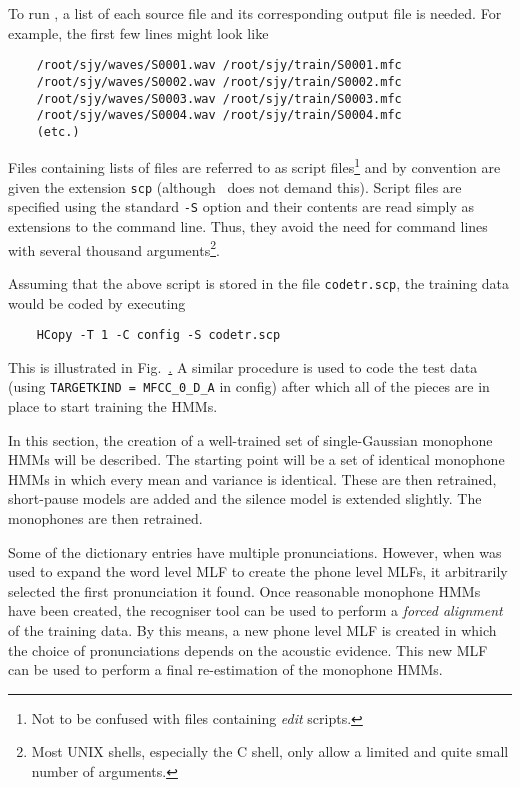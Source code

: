 To run ,  a list of
each source file and its corresponding output file is needed.  For example,
the first few lines might look like
\begin{verbatim}
    /root/sjy/waves/S0001.wav /root/sjy/train/S0001.mfc
    /root/sjy/waves/S0002.wav /root/sjy/train/S0002.mfc
    /root/sjy/waves/S0003.wav /root/sjy/train/S0003.mfc
    /root/sjy/waves/S0004.wav /root/sjy/train/S0004.mfc
    (etc.)
\end{verbatim}
Files containing lists of files are referred to as script files\footnote{
Not to be confused with files containing \textit{edit} scripts.
}
and
by convention are given the extension \texttt{scp} (although 
\HTK\ does not demand this).  Script files are specified using the standard
\texttt{-S} option and their contents are read simply as extensions
to the command line.  Thus, they avoid the need for command lines with
several thousand arguments\footnote{
Most UNIX shells, especially the C shell, only allow a limited and
quite small number of arguments.}.


\noindent
Assuming that the above script is stored in the file \texttt{codetr.scp},
the training data would be coded by executing
\begin{verbatim}
    HCopy -T 1 -C config -S codetr.scp
\end{verbatim}
This is illustrated in Fig.~\href{f:step5}. A similar procedure is
used to code the test data (using \verb|TARGETKIND = MFCC_0_D_A| in
config) after which all of the pieces are in place to start training
the HMMs.
 


In this section, the creation of a well-trained set of single-Gaussian
monophone HMMs will be described.  The starting point will be
a set of identical monophone HMMs in which every mean and variance is
identical.  These are then retrained, short-pause models are
added and the silence model is extended slightly.  The monophones
are then retrained.

Some of the dictionary entries have multiple pronunciations.  However,
when  was used to expand the word level MLF to create the
phone level MLFs, it arbitrarily selected the first pronunciation it found.
Once reasonable monophone HMMs have been created, the recogniser tool
 can be used to perform a \textit{forced alignment} 
of
the training data.  By this means, a new phone level MLF is created in which
the choice of pronunciations depends on the acoustic evidence.  This new
MLF can be used to perform a final re-estimation of the monophone HMMs.

